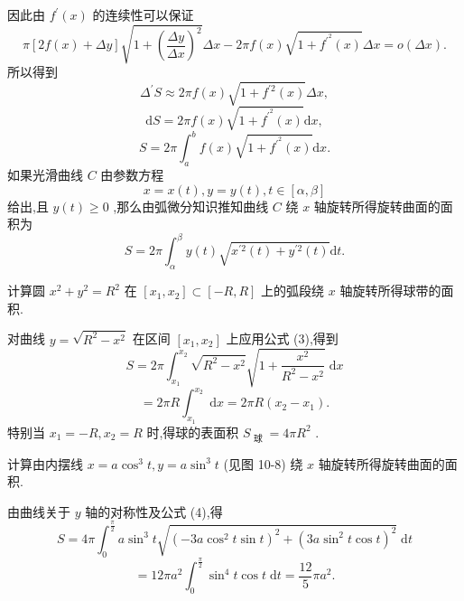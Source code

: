因此由 \({f}^{\prime }\left( x\right)\) 的连续性可以保证
\[
\pi \left\lbrack  {{2f}\left( x\right)  + {\Delta y}}\right\rbrack  \sqrt{1 + {\left( \frac{\Delta y}{\Delta x}\right) }^{2}}{\Delta x} - {2\pi f}\left( x\right) \sqrt{1 + {f}^{{\prime }^{2}}\left( x\right) }{\Delta x} = o\left( {\Delta x}\right) .
\]
所以得到
\[
{\Delta }^{\prime }S \approx  {2\pi f}\left( x\right) \sqrt{1 + {f}^{\prime 2}\left( x\right) }{\Delta x},
\]
\[
\mathrm{d}S = {2\pi f}\left( x\right) \sqrt{1 + {f}^{{\prime }^{2}}\left( x\right) }\mathrm{d}x,
\]
\[
S = {2\pi }{\int }_{a}^{b}f\left( x\right) \sqrt{1 + {f}^{{\prime }^{2}}\left( x\right) }\mathrm{d}x. \tag{3}
\]
如果光滑曲线 \(C\) 由参数方程
\[
x = x\left( t\right) ,y = y\left( t\right) ,t \in  \left\lbrack  {\alpha ,\beta }\right\rbrack
\]
给出,且 \(y\left( t\right)  \geq  0\) ,那么由弧微分知识推知曲线 \(C\) 绕 \(x\) 轴旋转所得旋转曲面的面积为
\[
S = {2\pi }{\int }_{\alpha }^{\beta }y\left( t\right) \sqrt{{x}^{\prime 2}\left( t\right)  + {y}^{\prime 2}\left( t\right) }\mathrm{d}t. \tag{4}
\]
\begin{example}

\end{example}
计算圆 \({x}^{2} + {y}^{2} = {R}^{2}\) 在 \(\left\lbrack  {{x}_{1},{x}_{2}}\right\rbrack   \subset  \left\lbrack  {-R,R}\right\rbrack\) 上的弧段绕 \(x\) 轴旋转所得球带的面积.

\begin{solution}

\end{solution}
对曲线 \(y = \sqrt{{R}^{2} - {x}^{2}}\) 在区间 \(\left\lbrack  {{x}_{1},{x}_{2}}\right\rbrack\) 上应用公式 (3),得到
\[
S = {2\pi }{\int }_{{x}_{1}}^{{x}_{2}}\sqrt{{R}^{2} - {x}^{2}}\sqrt{1 + \frac{{x}^{2}}{{R}^{2} - {x}^{2}}}\mathrm{\;d}x
\]
\[
= {2\pi R}{\int }_{{x}_{1}}^{{x}_{2}}\mathrm{\;d}x = {2\pi R}\left( {{x}_{2} - {x}_{1}}\right) .
\]
特别当 \({x}_{1} =  - R,{x}_{2} = R\) 时,得球的表面积 \({S}_{\text{ 球 }} = {4\pi }{R}^{2}\) .

\begin{example}

\end{example}
计算由内摆线 \(x = a{\cos }^{3}t,y = a{\sin }^{3}t\) (见图 10-8) 绕 \(x\) 轴旋转所得旋转曲面的面积.

\begin{solution}

\end{solution}
由曲线关于 \(y\) 轴的对称性及公式 (4),得
\[
S = {4\pi }{\int }_{0}^{\frac{\pi }{2}}{a{\sin }^{3}t\sqrt{{\left( {-{3a}{\cos }^{2}t\sin t}\right) }^{2} + {\left( {{3a}{\sin }^{2}t\cos t}\right) }^{2}}\mathrm{\;d}t}
\]
\[
= {12\pi }{a}^{2}{\int }_{0}^{\frac{\pi }{2}}{\sin }^{4}t\cos t\mathrm{\;d}t = \frac{12}{5}\pi {a}^{2}.
\]
